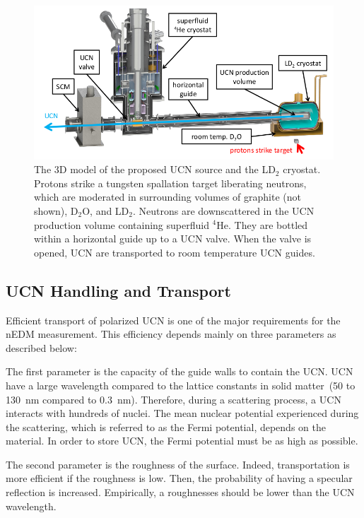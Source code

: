 \begin{figure}[h!]
  \centering
  \includegraphics[width=1.0\textwidth]{newUCNsource.png}
  \caption{The 3D model of the proposed UCN source and the LD$_2$
    cryostat. Protons strike a tungsten spallation target liberating
    neutrons, which are moderated in surrounding volumes of graphite
    (not shown), D$_2$O, and LD$_2$. Neutrons are downscattered in the
    UCN production volume containing superfluid $^4$He. They are
    bottled within a horizontal guide up to a UCN valve. When the
    valve is opened, UCN are transported to room temperature UCN
    guides.}
  \label{fig:newUCNsource}
\end{figure}



\subsection{UCN Handling and Transport}

Efficient transport of polarized UCN is one of the major requirements
for the nEDM measurement. This efficiency depends mainly
on three parameters as described below:

The first parameter is the capacity of the guide walls to contain the
UCN. UCN have a large wavelength compared to the lattice constants in
solid matter~(50 to 130~nm compared to 0.3~nm). Therefore, during a
scattering process, a UCN interacts with hundreds of nuclei. The mean
nuclear potential experienced during the scattering, which is referred
to as the Fermi potential, depends on the material. In order to store
UCN, the Fermi potential must be as high as possible.

The second parameter is the roughness of the surface. Indeed,
transportation is more efficient if the roughness is low. Then, the
probability of having a specular reflection is increased. Empirically,
a roughnesses should be lower than the UCN wavelength.

